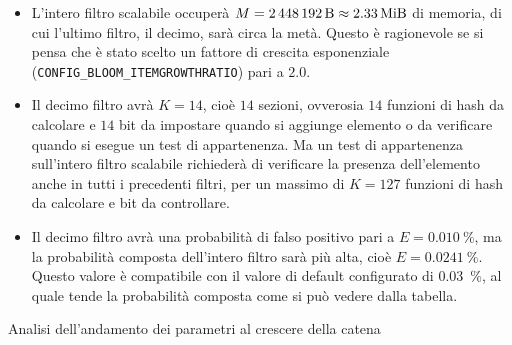 \medskip
\begin{itemize}
  \item L'intero filtro scalabile occuperà $M = \SI{2448192}{\byte} \approx \SI{2.33}{\mebi\byte}$
  di memoria, di cui l'ultimo filtro, il decimo, sarà circa la metà. Questo è ragionevole se si
  pensa che è stato scelto un fattore di crescita esponenziale (\verb|CONFIG_BLOOM_ITEMGROWTHRATIO|)
  pari a $2.0$.

  \item Il decimo filtro avrà $K=14$, cioè $14$ sezioni, ovverosia $14$ funzioni di hash da
  calcolare e $14$ bit da impostare quando si aggiunge elemento o da verificare quando si esegue un
  test di appartenenza. Ma un test di appartenenza sull'intero filtro scalabile richiederà di
  verificare la presenza dell'elemento anche in tutti i precedenti filtri, per un massimo di $K=127$
  funzioni di hash da calcolare e bit da controllare.

  \item Il decimo filtro avrà una probabilità di falso positivo pari a $E = \SI{0.010}{\%}$, ma la
  probabilità composta dell'intero filtro sarà più alta, cioè $E = \SI{0.0241}{\%}$. Questo valore è
  compatibile con il valore di default configurato di \SI{0.03}{\%}, al quale tende la probabilità
  composta come si può vedere dalla tabella.
\end{itemize}

\begin{table}[htb]
  \centering
  \hspace*{-2cm}
  
  \caption{Analisi dell'andamento dei parametri al crescere della catena}
  \label{tbl:scalingbloomparms}
  \hspace*{-2cm}
\end{table}

